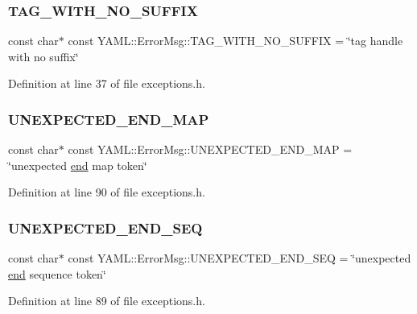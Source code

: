 \subsubsection{\texorpdfstring{TAG\_WITH\_NO\_SUFFIX}{TAG\_WITH\_NO\_SUFFIX}}
{\footnotesize\ttfamily const char$\ast$ const Y\+A\+M\+L\+::\+Error\+Msg\+::\+T\+A\+G\+\_\+\+W\+I\+T\+H\+\_\+\+N\+O\+\_\+\+S\+U\+F\+F\+IX = \char`\"{}tag handle with no suffix\char`\"{}}



Definition at line 37 of file exceptions.\+h.

\mbox{\label{namespace_y_a_m_l_1_1_error_msg_ab523f9cc6c9e7490584e344fe7bb549e}} 
\subsubsection{\texorpdfstring{UNEXPECTED\_END\_MAP}{UNEXPECTED\_END\_MAP}}
{\footnotesize\ttfamily const char$\ast$ const Y\+A\+M\+L\+::\+Error\+Msg\+::\+U\+N\+E\+X\+P\+E\+C\+T\+E\+D\+\_\+\+E\+N\+D\+\_\+\+M\+AP = \char`\"{}unexpected \mbox{\hyperlink{glad_8h_a432111147038972f06e049e18a837002}{end}} map token\char`\"{}}



Definition at line 90 of file exceptions.\+h.

\mbox{\label{namespace_y_a_m_l_1_1_error_msg_a9debb892c2d24a6fc94cd09347ec3d0c}} 
\subsubsection{\texorpdfstring{UNEXPECTED\_END\_SEQ}{UNEXPECTED\_END\_SEQ}}
{\footnotesize\ttfamily const char$\ast$ const Y\+A\+M\+L\+::\+Error\+Msg\+::\+U\+N\+E\+X\+P\+E\+C\+T\+E\+D\+\_\+\+E\+N\+D\+\_\+\+S\+EQ = \char`\"{}unexpected \mbox{\hyperlink{glad_8h_a432111147038972f06e049e18a837002}{end}} sequence token\char`\"{}}



Definition at line 89 of file exceptions.\+h.

\mbox{\label{namespace_y_a_m_l_1_1_error_msg_a0ccf3b2a3a6bd245ce36786680a1c66a}} 
